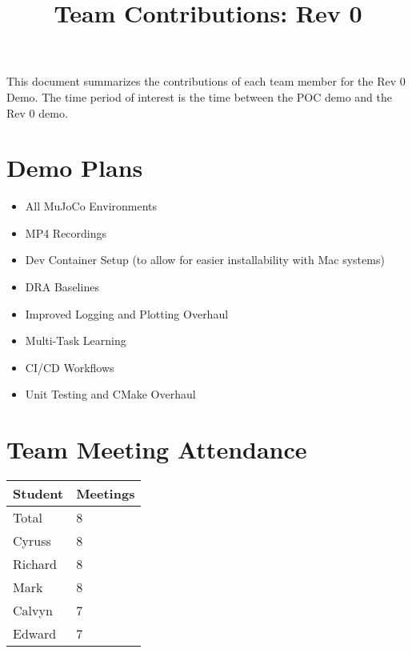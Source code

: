 \documentclass{article}
\title{Team Contributions: Rev 0\\\progname}
\author{\authname}
\date{}
\begin{document}
\maketitle

This document summarizes the contributions of each team member for the Rev 0
Demo.  The time period of interest is the time between the POC demo and the Rev
0 demo.

\section{Demo Plans}

\begin{itemize}
    \item All MuJoCo Environments
    \item MP4 Recordings
    \item Dev Container Setup (to allow for easier installability with Mac systems)
    \item DRA Baselines
    \item Improved Logging and Plotting Overhaul
    \item Multi-Task Learning
    \item CI/CD Workflows
    \item Unit Testing and CMake Overhaul
\end{itemize}

\section{Team Meeting Attendance}


\begin{table}[H]
\centering
\begin{tabular}{ll}
\toprule
\textbf{Student} & \textbf{Meetings}\\
\midrule
Total & 8\\
Cyruss & 8\\
Richard & 8\\
Mark & 8\\
Calvyn & 7\\
Edward & 7\\
\bottomrule
\end{tabular}
\end{table}
\end{document}
